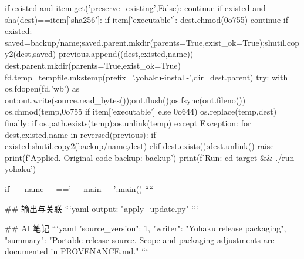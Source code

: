             if existed and item.get('preserve_existing',False):
                continue
            if existed and sha(dest)==item['sha256']:
                if item['executable']: dest.chmod(0o755)
                continue
            if existed:
                saved=backup/name;saved.parent.mkdir(parents=True,exist_ok=True);shutil.copy2(dest,saved)
            previous.append((dest,existed,name))
            dest.parent.mkdir(parents=True,exist_ok=True)
            fd,temp=tempfile.mkstemp(prefix='.yohaku-install-',dir=dest.parent)
            try:
                with os.fdopen(fd,'wb') as out:out.write(source.read_bytes());out.flush();os.fsync(out.fileno())
                os.chmod(temp,0o755 if item['executable'] else 0o644)
                os.replace(temp,dest)
            finally:
                if os.path.exists(temp):os.unlink(temp)
    except Exception:
        for dest,existed,name in reversed(previous):
            if existed:shutil.copy2(backup/name,dest)
            elif dest.exists():dest.unlink()
        raise
    print(f'Applied. Original code backup: {backup}')
    print(f'Run: cd {target} && ./run-yohaku')

if __name__=='__main__':main()
````

## 输出与关联
```yaml
output: "apply_update.py"
```

## AI 笔记
```yaml
{"source_version": 1, "writer": "Yohaku release packaging", "summary": "Portable release source. Scope and packaging adjustments are documented in PROVENANCE.md."}
```
